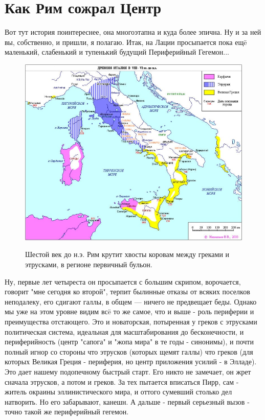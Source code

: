 \section{Как Рим сожрал Центр}

Вот тут история поинтереснее, она многоэтапна и куда более эпична. Ну и за ней вы, собственно, и пришли, я полагаю. Итак, на Лации просыпается пока ещë маленький, слабенький и тупенький будущий Периферийный Гегемон...

\begin{figure}[h!tb]
	\centering\includegraphics[scale=0.4]{regional_hehemons/1613656334110444030.png}
	\label{fig:heh4} %
	\caption{Шестой век до н.э. Рим крутит хвосты коровам между греками и этрусками, в регионе первичный бульон.}
\end{figure}

Ну, первые лет четыреста он просыпается с большим скрипом, ворочается, говорит "мне сегодня ко второй", терпит былинные отказы от всяких поселков неподалеку, его сдигают галлы, в общем — ничего не предвещает беды. Однако мы уже на этом уровне видим всë то же самое, что и выше - роль периферии и преимущества отстающего. Это и новаторская, потыренная у греков с этрусками политическая система, идеальная для масштабирования до бесконечности, и периферийность (центр "сапога" и "жопа мира" в те годы - синонимы), и почти полный игнор со стороны что этрусков (которых щемят галлы) что греков (для которых Великая Греция - периферия, но центр приложения усилий - в Элладе). Это дает нашему подопечному быстрый старт. Его никто не замечает, он жрет сначала этрусков, а потом и греков. За тех пытается вписаться Пирр, сам - житель окраины эллинистического мира, и оттого сумевший столько дел натворить. Но его забарывают, канешн. А дальше - первый серьезный вызов - точно такой же периферийный гегемон.


